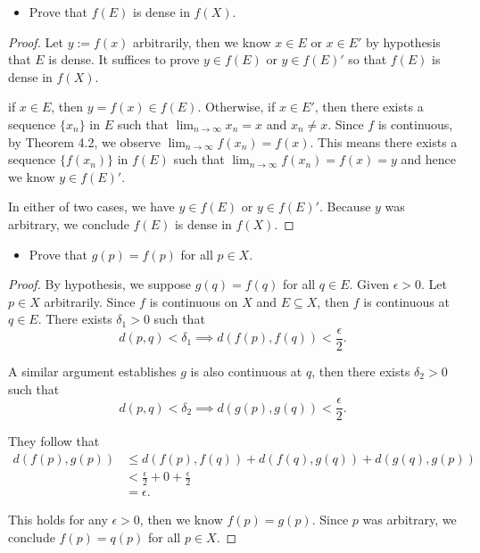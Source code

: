 \begin{Exercise}
\begin{itemize}
\item Prove that $f(E)$ is dense in $f(X)$.
\end{itemize}
\begin{proof}
Let $y := f(x)$ arbitrarily, then we know $x\in E$ or $x\in E'$ by hypothesis that $E$ is dense. It suffices to prove $y\in f(E)$ or $y\in f(E)'$ so that $f(E)$ is dense in $f(X)$.

if $x\in E$, then $y=f(x)\in f(E)$. Otherwise, if $x\in E'$, then there exists a sequence $\{x_n\}$ in $E$ such that $\lim_{n\to\infty} x_n = x$ and $x_n \neq x$. Since $f$ is continuous, by Theorem 4.2, we observe $\lim_{n\to\infty} f(x_n) = f(x)$. This means there exists a sequence $\{f(x_n)\}$ in $f(E)$ such that $\lim_{n\to\infty} f(x_n) = f(x) = y$ and hence we know $y\in f(E)'$.

In either of two cases, we have $y\in f(E)$ or $y\in f(E)'$. Because $y$ was arbitrary, we conclude $f(E)$ is dense in $f(X)$.
\end{proof}

\begin{itemize}
\item Prove that $g(p) = f(p)$ for all $p\in X$.
\end{itemize}
\begin{proof}
By hypothesis, we suppose $g(q) = f(q)$ for all $q\in E$. Given $\epsilon>0$. Let $p\in X$ arbitrarily. Since $f$ is continuous on $X$ and $E\subseteq X$, then $f$ is continuous at $q\in E$. There exists $\delta_1>0$ such that
$$
d(p,q)<\delta_1 \implies d(f(p),f(q))<\frac{\epsilon}{2}.
$$

A similar argument establishes $g$ is also continuous at $q$, then there exists $\delta_2>0$ such that
$$
d(p,q)<\delta_2 \implies d(g(p),g(q))<\frac{\epsilon}{2}.
$$

They follow that
\begin{align*}
d(f(p),g(p))
&\leq d(f(p), f(q)) + d(f(q), g(q)) + d(g(q), g(p)) \\
&< \frac{\epsilon}{2} + 0 + \frac{\epsilon}{2} \\
&= \epsilon.
\end{align*}

This holds for any $\epsilon>0$, then we know $f(p)=g(p)$. Since $p$ was arbitrary, we conclude $f(p)=q(p)$ for all $p\in X$.
\end{proof}
\end{Exercise}